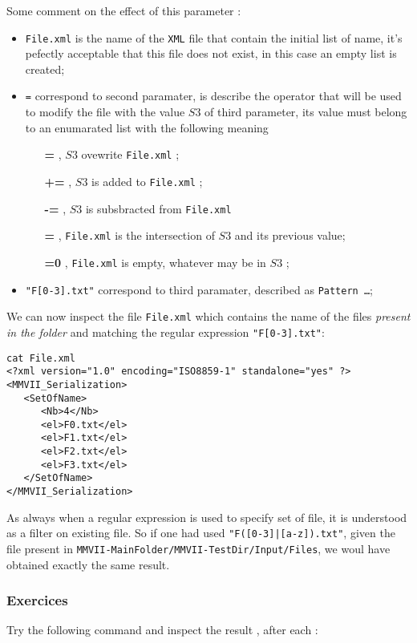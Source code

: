 \documentclass[a4paper]{book}
\newcommand{\MMVIDIR}{{\tt MMVII-MainFolder/}}
\begin{document}
Some comment on the effect of this parameter :
\begin{itemize}
   \item  {\tt File.xml} is the name of the {\tt XML} file  that contain the initial list of name, 
          it's pefectly acceptable that this file does not exist, in this case an empty list
          is created;

   \item  {\tt =} correspond to second paramater, is describe the operator that will be used to
          modify the file with the value $S3$ of third parameter,  its value must belong to an enumarated list with the following
          meaning
\begin{enumerate}
   \item[{\bf =}]  , $S3$ ovewrite    {\tt File.xml} ;
   \item[{\bf +=}] ,  $S3$ is added to {\tt File.xml} ;
   \item[{\bf -=}] , $S3$ is subsbracted from  {\tt File.xml}
   \item[{\bf *=}] , {\tt File.xml} is the intersection of $S3$ and its previous value;
   \item[{\bf =0}] , {\tt File.xml} is empty, whatever may be in  $S3$ ;
\end{enumerate}

   \item  {\tt "F[0-3].txt"} correspond to third paramater, described as {\tt Pattern \dots};
\end{itemize}


We can now inspect the file {\tt File.xml} which contains the name of the files
\emph{present in the folder} and matching the regular expression  {\tt "F[0-3].txt"}:

\begin{verbatim}
cat File.xml
<?xml version="1.0" encoding="ISO8859-1" standalone="yes" ?>
<MMVII_Serialization>
   <SetOfName>
      <Nb>4</Nb>
      <el>F0.txt</el>
      <el>F1.txt</el>
      <el>F2.txt</el>
      <el>F3.txt</el>
   </SetOfName>
</MMVII_Serialization>
\end{verbatim}

As always when  a regular expression is used to specify set of file,
it is understood as a filter on existing file. So if one had used {\tt "F([0-3]|[a-z]).txt"},
given the file present in  {\tt {\MMVIDIR}MMVII-TestDir/Input/Files}, we woul have
obtained exactly the same result.

\subsubsection{Exercices}
Try the following command and inspect the result , after each :
\end{document}
